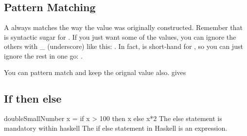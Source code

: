 \subsection{Pattern Matching}
A  always matches the way the value was originally constructed. Remember that  is syntactic sugar for .
If you just want some of the values, you can ignore the others with \_ (underscore) like this:
. 
In fact,  is short-hand for , so you can just ignore the rest in one go:
.

You can pattern match and keep the orignal value also.
gives 

\subsection{If then else}
doubleSmallNumber x = if x > 100  
                        then x  
                        else x*2   
The else statement is mandatory within haskell
The if else statement in Haskell is an expression.

